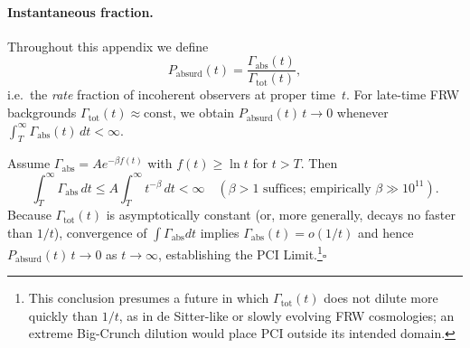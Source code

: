 \documentclass[12pt]{article}
\newcommand{\PCI}{PCI\xspace}
\begin{document}
\paragraph{Instantaneous fraction.}
Throughout this appendix we define
\[
   P_{\text{absurd}}(t)=\frac{\Gamma_{\text{abs}}(t)}{\Gamma_{\text{tot}}(t)},
\]
i.e.\ the \emph{rate} fraction of incoherent observers at proper
time~$t$.  For late-time FRW backgrounds $\Gamma_{\text{tot}}(t)\!\approx\!
\text{const}$, we obtain $P_{\text{absurd}}(t)\,t\to0$ whenever
$\int_{T}^{\infty}\Gamma_{\text{abs}}(t)\,dt<\infty$.

Assume $\Gamma_{\text{abs}}=Ae^{-\beta f(t)}$ with $f(t)\ge\ln t$ for $t>T$.
Then
\[
  \int_T^\infty \Gamma_{\text{abs}}\,dt
  \le A\!\int_T^\infty t^{-\beta}\,dt<\infty
  \quad(\beta>1\text{ suffices; empirically }\beta\gg10^{11}).
\]
Because $\Gamma_{\text{tot}}(t)$ is asymptotically constant (or, more generally, decays no faster than $1/t$), convergence of
$\int\Gamma_{\text{abs}}dt$ implies $\Gamma_{\text{abs}}(t)=o(1/t)$ and hence $P_{\text{absurd}}(t)\,t\to0$ as $t\to\infty$, establishing the \PCI Limit.\footnote{This conclusion presumes a future in which $\Gamma_{\text{tot}}(t)$ does not dilute more quickly than $1/t$, as in de Sitter-like or slowly evolving FRW cosmologies; an extreme Big-Crunch dilution would place PCI outside its intended domain.}\hfill$\square$
\end{document}

